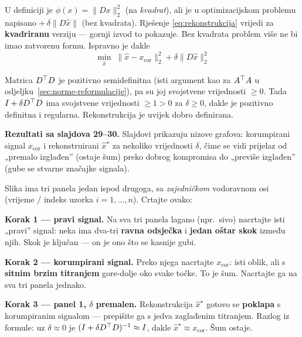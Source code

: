 \begin{zadatak}
\begin{napomena}
U definiciji je $\phi(x) = \|Dx\|_2^2$ (na \emph{kvadrat}), ali je u
optimizacijskom problemu napisano $+\,\delta\|D\hat x\|$ (bez kvadrata).
Rješenje \eqref{eq:rekonstrukcija} vrijedi za \textbf{kvadriranu} verziju ---
gornji izvod to pokazuje. Bez kvadrata problem više ne bi imao zatvorenu formu.
Ispravno je dakle
\[
\min_{\hat x}\; \|\hat x - x_{\text{cor}}\|_2^2 + \delta\|D\hat x\|_2^2
\]
\end{napomena}

\begin{napomena}
Matrica $D^{\top} D$ je pozitivno semidefinitna (isti argument kao za $A^{\top} A$ u
odjeljku~\ref{sec:norme-reformulacije}), pa su joj svojstvene vrijednosti $\ge 0$. Tada
$I + \delta D^{\top} D$ ima svojstvene vrijednosti $\ge 1 > 0$ za $\delta \ge 0$,
dakle je pozitivno definitna i regularna. Rekonstrukcija je uvijek dobro
definirana.
\end{napomena}

\textbf{Rezultati sa slajdova 29--30.} Slajdovi prikazuju nizove grafova:
korumpirani signal $x_{\text{cor}}$ i rekonstruirani $\hat x^\star$ za nekoliko
vrijednosti $\delta$, čime se vidi prijelaz od „premalo izglađen” (ostaje šum)
preko dobrog kompromisa do „previše izglađen” (gube se stvarne značajke
signala).

\begin{crtanje}
Slika ima tri panela jedan ispod drugoga, sa \emph{zajedničkom} vodoravnom osi
(vrijeme / indeks uzorka $i = 1,\dots,n$). Crtajte ovako:

\textbf{Korak 1 --- pravi signal.} Na sva tri panela lagano (npr.\ sivo)
nacrtajte isti „pravi” signal: neka ima dva-tri \textbf{ravna odsječka} i
\textbf{jedan oštar skok} između njih. Skok je ključan --- on je ono što se
kasnije gubi.

\textbf{Korak 2 --- korumpirani signal.} Preko njega nacrtajte $x_{\text{cor}}$:
isti oblik, ali s \textbf{sitnim brzim titranjem} gore-dolje oko svake točke.
To je šum. Nacrtajte ga na sva tri panela jednako.

\textbf{Korak 3 --- panel 1, $\delta$ premalen.} Rekonstrukcija $\hat x^\star$
gotovo se \textbf{poklapa} s korumpiranim signalom --- prepišite ga s jedva
zaglađenim titranjem. Razlog iz formule: uz $\delta \approx 0$ je
$(I + \delta D^{\top} D)^{-1} \approx I$, dakle $\hat x^\star \approx x_{\text{cor}}$.
Šum ostaje.


\end{crtanje}
\end{zadatak}
